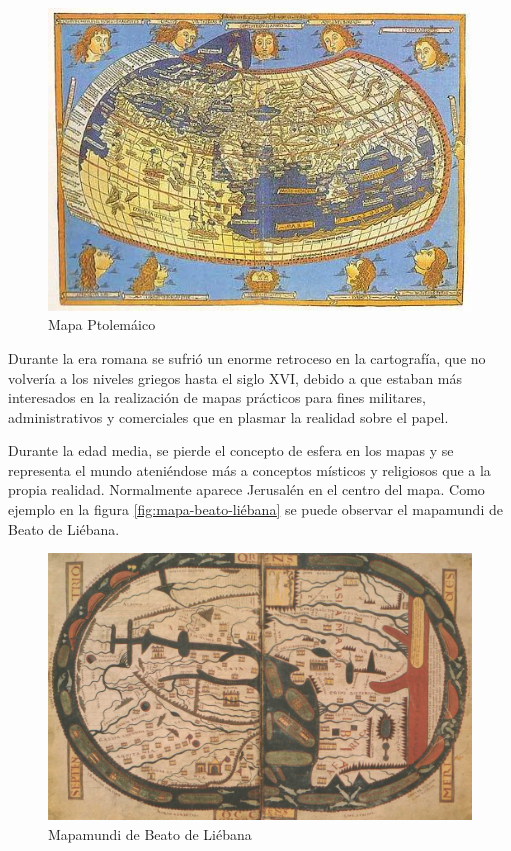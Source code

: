 \begin{figure}[h!btp]
\centering
\includegraphics[width=120mm, fbox={\fboxrule} 0mm]{images/03-antecedentes/33-mapa_ptolomeo.jpg}
\caption{Mapa Ptolemáico}
\label{fig:mapa-ptolomeo}
\end{figure}

Durante la era romana se sufrió un enorme retroceso en la cartografía, que no volvería a los niveles griegos hasta el siglo XVI, debido a que estaban más interesados en la realización de mapas prácticos para fines militares, administrativos y comerciales que en plasmar la realidad sobre el papel.

Durante la edad media, se pierde el concepto de esfera en los mapas y se representa el mundo ateniéndose más a conceptos místicos y religiosos que a la propia realidad. Normalmente aparece Jerusalén en el centro del mapa. Como ejemplo en la figura \ref{fig:mapa-beato-liébana} se puede observar el mapamundi de Beato de Liébana.

\begin{figure}[h!btp]
\centering
\includegraphics[width=160mm, fbox={\fboxrule} 0mm]{images/03-antecedentes/34-mapa_beato_liebana.jpg}
\caption{Mapamundi de Beato de Liébana}
\label{fig:mapa-beato-liebana}
\end{figure}

